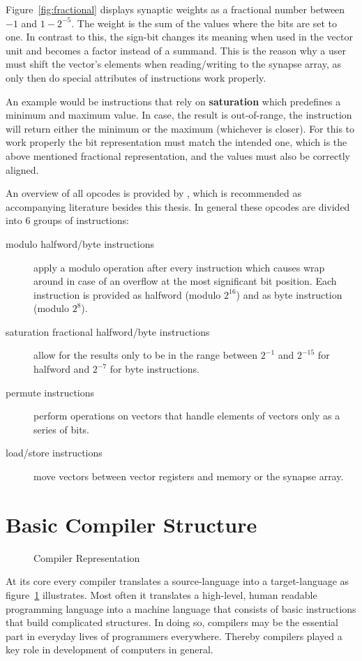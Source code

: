 {Figure~\ref{fig:fractional} displays synaptic weights as a fractional number between $-1$ and $1-2^{-5}$.
The weight is the sum of the values where the bits are set to one.
In contrast to this, the sign-bit changes its meaning when used in the vector unit and becomes a factor instead of a summand.
This is the reason why a user must shift the vector's elements when reading/writing to the synapse array, as only then do special attributes of instructions work properly.

An example would be instructions that rely on \textbf{saturation} which predefines a minimum and maximum value.
In case, the result is out-of-range, the instruction will return either the minimum or the maximum (whichever is closer).
For this to work properly the bit representation must match the intended one, which is the above mentioned fractional representation, and the values must also be correctly aligned.

An overview of all opcodes is provided by \cite{nuxmanual}, which is recommended as accompanying literature besides this thesis.
In general these opcodes are divided into 6 groups of instructions:
\begin{description}
    \item[modulo halfword/byte instructions] apply a modulo operation after every instruction which causes wrap around in case of an overflow at the most significant bit position.
        Each instruction is provided as halfword (modulo $2^{16}$) and as byte instruction (modulo $2^{8}$).
    \item[saturation fractional halfword/byte instructions] allow for the results only to be in the range between $2^{-1}$ and $2^{-15}$ for halfword and $2^{-7}$ for byte instructions.
    \item[permute instructions] perform operations on vectors that handle elements of vectors only as a series of bits.
    \item[load/store instructions] move vectors between vector registers and memory or the synapse array.
\end{description}


\section{Basic Compiler Structure}
\label{section:compiler}

\begin{figure}
    \centering
        
        \caption{\label{fig:compiler} Compiler Representation}
\end{figure}
At its core every compiler translates a source-language into a target-language as figure~\ref{fig:compiler} illustrates.
Most often it translates a high-level, human readable programming language into a machine language that consists of basic instructions that build complicated structures.
In doing so, compilers may be the essential part in everyday lives of programmers everywhere.
Thereby compilers played a key role in development of computers in general.

}
